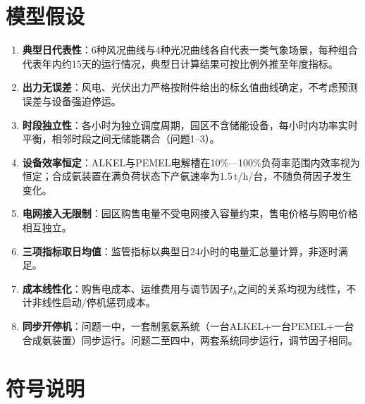 \documentclass[UTF8,12pt,a4paper]{ctexart}
\begin{document}
\section{模型假设}

\begin{enumerate}[label=假设\arabic*：, leftmargin=6em, itemsep=0.2em]
  \item \textbf{典型日代表性}：6种风况曲线与4种光况曲线各自代表一类气象场景，每种组合代表年内约15天的运行情况，典型日计算结果可按比例外推至年度指标。
  \item \textbf{出力无误差}：风电、光伏出力严格按附件给出的标幺值曲线确定，不考虑预测误差与设备强迫停运。
  \item \textbf{时段独立性}：各小时为独立调度周期，园区不含储能设备，每小时内功率实时平衡，相邻时段之间无储能耦合（问题1--3）。
  \item \textbf{设备效率恒定}：ALKEL与PEMEL电解槽在10\%—100\%负荷率范围内效率视为恒定；合成氨装置在满负荷状态下产氨速率为1.5\,t/h/台，不随负荷因子发生变化。
  \item \textbf{电网接入无限制}：园区购售电量不受电网接入容量约束，售电价格与购电价格相互独立。
  \item \textbf{三项指标取日均值}：监管指标以典型日24小时的电量汇总量计算，非逐时满足。
  \item \textbf{成本线性化}：购售电成本、运维费用与调节因子$t_h$之间的关系均视为线性，不计非线性启动/停机惩罚成本。
  \item \textbf{同步开停机}：问题一中，一套制氢氨系统（一台ALKEL+一台PEMEL+一台合成氨装置）同步运行。问题二至四中，两套系统同步运行，调节因子相同。
\end{enumerate}

\section{符号说明}
\end{document}
